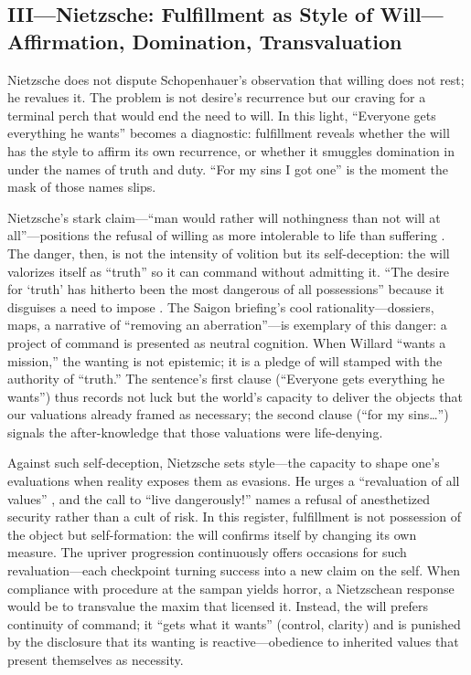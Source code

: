 \subsection*{III—Nietzsche: Fulfillment as Style of Will—Affirmation, Domination, Transvaluation}
\label{ssec:iii-nietzsche}
Nietzsche does not dispute Schopenhauer's observation that willing does not rest; he revalues
it. The problem is not desire's recurrence but our craving for a terminal perch that would end
the need to will. In this light, ``Everyone gets everything he wants'' becomes a diagnostic:
fulfillment reveals whether the will has the style to affirm its own recurrence, or whether it
smuggles domination in under the names of truth and duty. ``For my sins I got one'' is the
moment the mask of those names slips.

Nietzsche's stark claim—``man would rather will nothingness than not will at all''—positions
the refusal of willing as more intolerable to life than suffering
. The danger, then, is not the intensity of
volition but its self-deception: the will valorizes itself as ``truth'' so it can command
without admitting it. ``The desire for `truth' has hitherto been the most dangerous of all
possessions'' because it disguises a need to impose \parencite[\S 34]{NietzscheBGE1990}.
The Saigon briefing's cool rationality—dossiers, maps, a narrative of ``removing an
aberration''—is exemplary of this danger: a project of command is presented as neutral cognition.
When Willard ``wants a mission,'' the wanting is not epistemic; it is a pledge of will stamped
with the authority of ``truth.'' The sentence's first clause (``Everyone gets everything he
wants'') thus records not luck but the world's capacity to deliver the objects that our
valuations already framed as necessary; the second clause (``for my sins\ldots'') signals
the after-knowledge that those valuations were life-denying.

Against such self-deception, Nietzsche sets style—the capacity to shape one's evaluations when
reality exposes them as evasions. He urges a ``revaluation of all values''
\parencite[\S\S 203--211]{NietzscheBGE1990}, and the call to ``live dangerously!''
\parencite[\S 283]{NietzscheBGE1990} names a refusal of anesthetized security rather than a
cult of risk. In this register, fulfillment is not possession of the object but self-formation:
the will confirms itself by changing its own measure. The upriver progression continuously
offers occasions for such revaluation—each checkpoint turning success into a new claim on the
self. When compliance with procedure at the sampan yields horror, a Nietzschean response would
be to transvalue the maxim that licensed it. Instead, the will prefers continuity of command;
it ``gets what it wants'' (control, clarity) and is punished by the disclosure that its wanting
is reactive—obedience to inherited values that present themselves as necessity.

